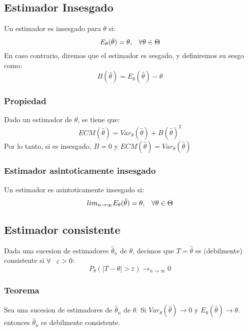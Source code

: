 \documentclass[titlepage,a4paper]{article}
\begin{document}
\subsection{Estimador Insesgado}
Un estimador es insesgado para $\theta$ si:
\begin{equation*}
    E_{\theta}(\hat{\theta}) = \theta, \hspace{8px} \forall \theta \in \Theta
\end{equation*} 
En caso contrario, diremos que el estimador es sesgado, y definiremos su sesgo como:
\begin{equation*}
    B(\hat{\theta}) = E_{\theta}(\hat{\theta}) - \theta
\end{equation*}
\subsubsection{Propiedad}
Dado un estimador de $\theta$, se tiene que:
\begin{equation*}
    ECM(\hat{\theta}) = Var_{\theta}(\hat{\theta}) + B(\hat{\theta})^{2}
\end{equation*}
Por lo tanto, si es insesgado, $B = 0$ y $ECM(\hat{\theta}) =  Var_{\theta}(\hat{\theta})$
\subsubsection{Estimador asintoticamente insesgado}
Un estimador es asintoticamente insesgado si:
\begin{equation*}
    lim_{n\rightarrow \infty} E_{\theta}(\hat{\theta}) = \theta, \hspace{8px} \forall \theta \in \Theta
\end{equation*}
\subsection{Estimador consistente}
Dada una sucesion de estimadores $\hat{\theta}_{n}$ de $\theta$, decimos que $T=\hat{\theta}$ es (debilmente) consistente si $\forall \hspace{8px}\varepsilon > 0$:
\begin{equation*}
    P_{\theta}(|T - \theta| > \varepsilon) \rightarrow_{n\rightarrow \infty} 0
\end{equation*}
\subsubsection{Teorema}
Sea una sucesion de estimadores de $\hat{\theta}_{n}$ de $\theta$. Si $Var_{\theta}(\hat{\theta}) \rightarrow 0$ y $E_{\theta}(\hat{\theta}) \rightarrow \theta$.
entonces $\hat{\theta}_{n}$ es debilmente consistente.
\end{document}
